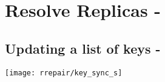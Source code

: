 \section{Resolve Replicas - }
\subsection{Updating a list of keys - }
\texttt{[image: rrepair/key\_sync\_s]}


